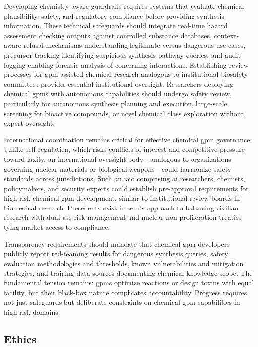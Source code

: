 Developing chemistry-aware guardrails requires systems that evaluate chemical plausibility, safety, and regulatory compliance before providing synthesis information. These technical safeguards should integrate real-time hazard assessment checking outputs against controlled substance databases, context-aware refusal mechanisms understanding legitimate versus dangerous use cases, precursor tracking identifying suspicious synthesis pathway queries, and audit logging enabling forensic analysis of concerning interactions. Establishing review processes for \gls{gpm}-assisted chemical research analogous to institutional biosafety committees provides essential institutional oversight. Researchers deploying chemical \glspl{gpm} with autonomous capabilities should undergo safety review, particularly for autonomous synthesis planning and execution, large-scale screening for bioactive compounds, or novel chemical class exploration without expert oversight.

International coordination remains critical for effective chemical \gls{gpm} governance. Unlike self-regulation, which risks conflicts of interest and competitive pressure toward laxity, an international oversight body---analogous to organizations governing nuclear materials or biological weapons---could harmonize safety standards across jurisdictions. Such an \gls{iaio} comprising \gls{ai} researchers, chemists, policymakers, and security experts could establish pre-approval requirements for high-risk chemical \gls{gpm} development, similar to institutional review boards in biomedical research.\autocite{trager2023international} Precedents exist in \gls{cern}'s approach to balancing civilian research with dual-use risk management and nuclear non-proliferation treaties tying market access to compliance.

Transparency requirements should mandate that chemical \gls{gpm} developers publicly report red-teaming results for dangerous synthesis queries, safety evaluation methodologies and thresholds, known vulnerabilities and mitigation strategies, and training data sources documenting chemical knowledge scope. The fundamental tension remains: \glspl{gpm} optimize reactions or design toxins with equal facility, but their black-box nature complicates accountability. Progress requires not just safeguards but deliberate constraints on chemical \gls{gpm} capabilities in high-risk domains.


\subsection{Ethics} \label{sec:ethics}

